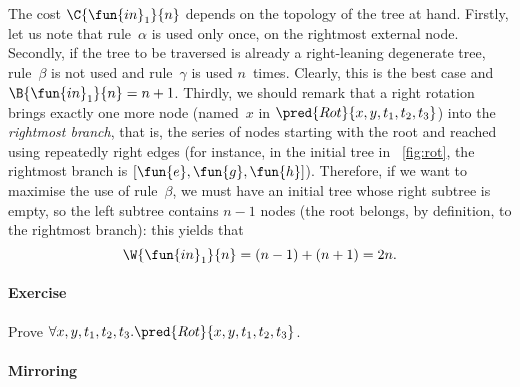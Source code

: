 The cost \(\C{\fun{in}_1}{n}\) depends
on the topology of the tree at hand. Firstly, let us note that
rule~\(\alpha\) is used only once, on the rightmost external
node. Secondly, if the tree to be traversed is already a
right\hyp{}leaning degenerate 
tree, rule~\(\beta\) is not used and rule~\(\gamma\) is used
\(n\)~times. Clearly, this is the best case and \(\B{\fun{in}_1}{n} =
n + 1\). Thirdly, we should remark that
a right rotation brings exactly one more node (named~\(x\) in
\(\pred{Rot}{x,y,t_1,t_2,t_3}\)) into the
\emph{rightmost branch}, that is, the series of
nodes starting with the root and reached using repeatedly right edges
(for instance, in the initial tree in \fig~\vref{fig:rot}, the
rightmost branch is \([\fun{e}, \fun{g},
\fun{h}]\)). Therefore, if we want to maximise the use of
rule~\(\beta\), we must have an initial tree whose right subtree is
empty, so the left subtree contains \(n-1\) nodes (the root belongs,
by definition, to the rightmost branch): this yields that
\begin{equation*}
  \W{\fun{in}_1}{n} = (n-1) + (n+1) = 2n.
  \index{in1@$\W{\fun{in}_1}{n}$}
  \index{binary tree!rotation|)}
\end{equation*}

\paragraph{Exercise}

Prove \(\forall x,y,t_1,t_2,t_3.\pred{Rot}{x,y,t_1,t_2,t_3}\).

\paragraph{Mirroring}

